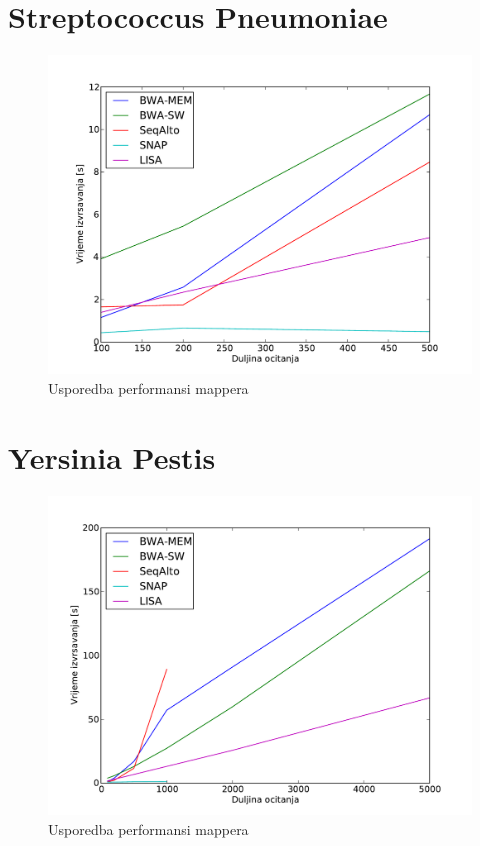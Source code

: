 \documentclass[times, utf8, diplomski]{fer}
\begin{document}
\section {Streptococcus Pneumoniae}

\begin{figure}[H]
\centering
\includegraphics[width=1.0\textwidth]{../img/streptococcus-time.pdf}
\caption{Usporedba performansi mappera}
\end{figure}

\section {Yersinia Pestis}

\begin{figure}[H]
\centering
\includegraphics[width=1.0\textwidth]{../img/yersinia-time.pdf}
\caption{Usporedba performansi mappera}
\end{figure}
\end{document}
